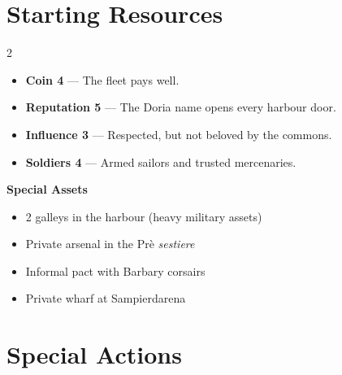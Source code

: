 \section{Starting Resources}


\begin{multicols}{2}
\begin{itemize}
  \item \textbf{Coin 4} --- The fleet pays well.
  \item \textbf{Reputation 5} --- The Doria name opens every harbour door.
  \item \textbf{Influence 3} --- Respected, but not beloved by the commons.
  \item \textbf{Soldiers 4} --- Armed sailors and trusted mercenaries.
\end{itemize}
\columnbreak
\textbf{Special Assets}
\begin{itemize}
  \item 2 galleys in the harbour (heavy military assets)
  \item Private arsenal in the Prè \textit{sestiere}
  \item Informal pact with Barbary corsairs
  \item Private wharf at Sampierdarena
\end{itemize}
\end{multicols}

\section{Special Actions}




